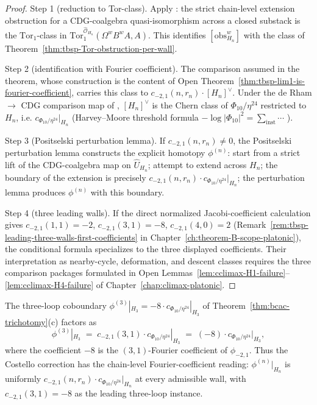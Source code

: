 \begin{proof}
Step 1 (reduction to Tor-class). Apply
\cite[Prop.~3.5]{Positselski11}: the strict chain-level extension
obstruction for a CDG-coalgebra quasi-isomorphism across a closed
substack is the $\mathrm{Tor}_1$-class in
$\mathrm{Tor}_1^{\widehat{\mathcal{O}}_{H_n}}(\Omega^w B^w A,A)$.
This identifies
$[\mathrm{obs}^w_{H_n}]$ with the class of
Theorem~\ref{thm:tbsp-Tor-obstruction-per-wall}.

Step 2 (identification with Fourier coefficient).  The comparison
assumed in the theorem, whose construction is the content of Open
Theorem~\ref{thm:tbsp-lim1-is-fourier-coefficient}, carries this class
to $c_{-2,1}(n,r_n)\cdot[H_n]^\vee$. Under the de Rham
$\to$ CDG comparison map of
\cite[\S7]{Positselski11}, $[H_n]^\vee$ is the Chern class of
$\Phi_{10}/\eta^{24}$ restricted to $H_n$, i.e.
$c_{\Phi_{10}/\eta^{24}}|_{H_n}$
(Harvey--Moore threshold formula
$-\log|\Phi_{10}|^2=\sum_{\text{inst}}\cdots$
\cite{HarveyMoore1995}).

Step 3 (Positselski perturbation lemma). If
$c_{-2,1}(n,r_n)\neq 0$, the Positselski perturbation lemma
\cite[\S\S3--4]{Positselski11} constructs the explicit homotopy
$\phi^{(n)}$: start from a strict lift of the CDG-coalgebra map on
$\widehat{U}_{H_n}$; attempt to extend across $H_n$; the
boundary of the extension is precisely
$c_{-2,1}(n,r_n)\cdot c_{\Phi_{10}/\eta^{24}}|_{H_n}$; the
perturbation lemma produces $\phi^{(n)}$ with this boundary.

Step 4 (three leading walls).  If the direct normalized
Jacobi-coefficient calculation gives
$c_{-2,1}(1,1)=-2$, $c_{-2,1}(3,1)=-8$, $c_{-2,1}(4,0)=2$
(Remark~\ref{rem:tbsp-leading-three-walls-first-coefficients} in
Chapter~\ref{ch:theorem-B-scope-platonic}), the conditional formula
specializes to the three displayed coefficients.  Their interpretation
as nearby-cycle, deformation, and descent classes requires the three
comparison packages formulated in Open
Lemmas~\ref{lem:cclimax-H1-failure}--\ref{lem:cclimax-H4-failure}
of Chapter~\ref{chap:climax-platonic}.
\end{proof}

\begin{remark}[Chain-level comparison with the three-loop
$\phi^{(3)}=-8$ formula]
\label{rem:bcac-three-loop-comparison}
The three-loop coboundary
$\phi^{(3)}|_{H_3}=-8\cdot c_{\Phi_{10}/\eta^{24}}|_{H_3}$ of
Theorem~\ref{thm:bcac-trichotomy}(c) factors as
\[
 \phi^{(3)}|_{H_3}
 \;=\;
 c_{-2,1}(3,1)\cdot c_{\Phi_{10}/\eta^{24}}|_{H_3}
 \;=\;
 (-8)\cdot c_{\Phi_{10}/\eta^{24}}|_{H_3},
\]
where the coefficient $-8$ is the $(3,1)$-Fourier coefficient of
$\phi_{-2,1}$. Thus the Costello correction
\cite{Costello2013,CostelloGaiotto2018} has the chain-level
Fourier-coefficient reading:
$\phi^{(n)}|_{H_n}$ is uniformly
$c_{-2,1}(n,r_n)\cdot c_{\Phi_{10}/\eta^{24}}|_{H_n}$ at every
admissible wall, with $c_{-2,1}(3,1)=-8$ as the leading three-loop
instance.
\end{remark}

